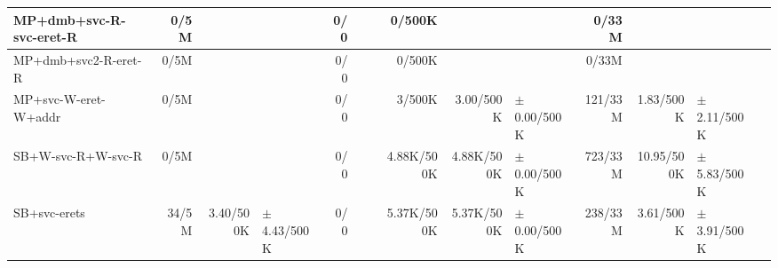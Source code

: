 \begin{tabular}{l  | r r l | r r l | r r l | r r l l}
   MP+dmb+svc-R-svc-eret-R &           0/5M &                       &                 &            0/0 &                       &  &         0/500K &                       &                 &          0/33M &                       &                 & \\ \hline 
      MP+dmb+svc2-R-eret-R &           0/5M &                       &                 &            0/0 &                       &  &         0/500K &                       &                 &          0/33M &                       &                 & \\ \hline 
      MP+svc-W-eret-W+addr &           0/5M &                       &                 &            0/0 &                       &  &         3/500K &             3.00/500K & $\pm$ 0.00/500K &        121/33M &             1.83/500K & $\pm$ 2.11/500K & \\ \hline 
        SB+W-svc-R+W-svc-R &           0/5M &                       &                 &            0/0 &                       &  &     4.88K/500K &            4.88K/500K & $\pm$ 0.00/500K &        723/33M &            10.95/500K & $\pm$ 5.83/500K & \\ \hline 
              SB+svc-erets &          34/5M &             3.40/500K & $\pm$ 4.43/500K &            0/0 &                       &  &     5.37K/500K &            5.37K/500K & $\pm$ 0.00/500K &        238/33M &             3.61/500K & $\pm$ 3.91/500K & \\ \hline 
\end{tabular}
